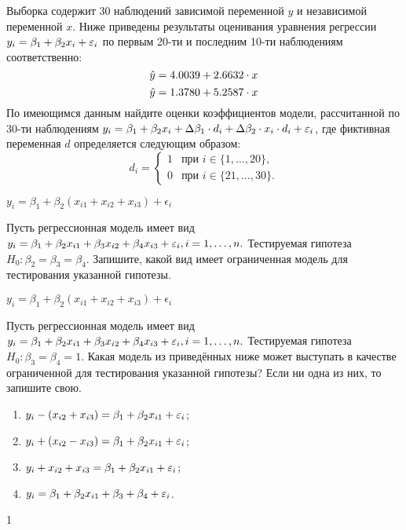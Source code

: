 \begin{problem} %
 Выборка содержит 30 наблюдений зависимой переменной $y$ и независимой переменной $x$. Ниже приведены результаты оценивания уравнения регрессии $y_i=\beta_1+\beta_2 x_i+\varepsilon_i$ по первым 20-ти и последним 10-ти наблюдениям соответственно:
\[
\hat{y}=4.0039+2.6632\cdot{x}
\]
\[
\hat{y}=1.3780+5.2587\cdot{x}
\]
По имеющимся данным найдите оценки коэффициентов  модели, рассчитанной по 30-ти наблюдениям $y_i=\beta_1+\beta_2 x_i+\Delta{\beta_1} \cdot{d_i} + \Delta{\beta_2} \cdot{x_i} \cdot{d_i}+\varepsilon_i$, где фиктивная переменная $d$ определяется следующим образом:
\[
d_i =
  \begin{cases}
    1 & \text{при } i \in \bigl\{ 1,\dots,20 \bigr\} , \\
    0 & \text{при } i \in \bigl\{ 21,\dots,30 \bigr\} .
 \end{cases}
\]


\begin{sol}
$y_i=\beta_1+\beta_2(x_{i1}+x_{i2}+x_{i3})+\epsilon_{i}$
\end{sol}
\end{problem}



\begin{problem} %
 Пусть регрессионная модель имеет вид $y_i=\beta_1+\beta_2 x_{i1}+\beta_3 x_{i2}+\beta_4 x_{i3}+\varepsilon_i, i=1,\dots,n.$ Тестируемая гипотеза $H_0: \beta_2=\beta_3=\beta_4.$ Запишите, какой вид имеет ограниченная модель для тестирования указанной гипотезы.

\begin{sol}
$y_i=\beta_1+\beta_2(x_{i1}+x_{i2}+x_{i3})+\epsilon_{i}$
\end{sol}
\end{problem}



\begin{problem}
Пусть регрессионная модель имеет вид $y_i= \beta_1+ \beta_2 x_{i1}+ \beta_3 x_{i2}+ \beta_4 x_{i3}+\varepsilon_i, i=1,\dots,n.$ Тестируемая гипотеза $H_0: \beta_3= \beta_4=1.$ Какая модель из приведённых ниже может выступать в качестве ограниченной для тестирования указанной гипотезы? Если ни одна из них, то запишите свою.
\begin{enumerate}
\item $y_i-(x_{i2}+x_{i3}) = \beta_1+ \beta_2 x_{i1}+ \varepsilon_i$;
\item $y_i+(x_{i2}-x_{i3}) = \beta_1+ \beta_2 x_{i1}+ \varepsilon_i$;
\item $y_i+x_{i2}+x_{i3} = \beta_1+ \beta_2 x_{i1}+ \varepsilon_i$;
\item $y_i= \beta_1+ \beta_2 x_{i1}+ \beta_3 + \beta_4 + \varepsilon_i$.
\end{enumerate}


\begin{sol}
1
\end{sol}
\end{problem}





